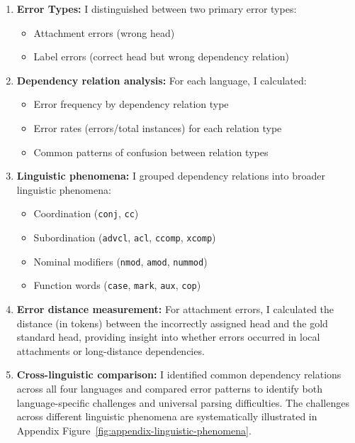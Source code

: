 \documentclass[11pt]{article}
\begin{document}
\begin{enumerate}
    \item \textbf{Error Types:} I distinguished between two primary error types:
    \begin{itemize}
        \item Attachment errors (wrong head)
        \item Label errors (correct head but wrong dependency relation)
    \end{itemize}
    
    \item \textbf{Dependency relation analysis:} For each language, I calculated:
    \begin{itemize}
        \item Error frequency by dependency relation type
        \item Error rates (errors/total instances) for each relation type
        \item Common patterns of confusion between relation types
    \end{itemize}
    
    \item \textbf{Linguistic phenomena:} I grouped dependency relations into broader linguistic phenomena:
    \begin{itemize}
        \item Coordination (\texttt{conj}, \texttt{cc})
        \item Subordination (\texttt{advcl}, \texttt{acl}, \texttt{ccomp}, \texttt{xcomp})
        \item Nominal modifiers (\texttt{nmod}, \texttt{amod}, \texttt{nummod})
        \item Function words (\texttt{case}, \texttt{mark}, \texttt{aux}, \texttt{cop})
    \end{itemize}
    
    \item \textbf{Error distance measurement:} For attachment errors, I calculated the distance (in tokens) between the incorrectly assigned head and the gold standard head, providing insight into whether errors occurred in local attachments or long-distance dependencies.
    
    \item \textbf{Cross-linguistic comparison:} I identified common dependency relations across all four languages and compared error patterns to identify both language-specific challenges and universal parsing difficulties. The challenges across different linguistic phenomena are systematically illustrated in Appendix Figure~\ref{fig:appendix-linguistic-phenomena}.
\end{enumerate}
\end{document}
